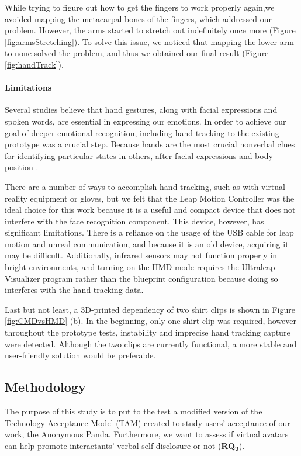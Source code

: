While trying to figure out how to get the fingers to work properly again,we avoided mapping the metacarpal bones of the fingers, which addressed our problem. However, the arms started to stretch out indefinitely once more (Figure \ref{fig:armsStretching}). To solve this issue, we noticed that mapping the lower arm to none solved the problem, and thus we obtained our final result (Figure \ref{fig:handTrack}).

\paragraph{Limitations}
Several studies \cite{ARJ20, WAX97, REI22} believe that hand gestures, along with facial expressions and spoken words, are essential in expressing our emotions. In order to achieve our goal of deeper emotional recognition, including hand tracking to the existing prototype was a crucial step. Because hands are the most crucial nonverbal clues for identifying particular states in others, after facial expressions and body position \cite{WAX97, REI22}.

There are a number of ways to accomplish hand tracking, such as with virtual reality equipment or gloves, but we felt that the Leap Motion Controller was the ideal choice for this work because it is a useful and compact device that does not interfere with the face recognition component. This device, however, has significant limitations. There is a reliance on the usage of the USB cable for leap motion and unreal communication, and because it is an old device, acquiring it may be difficult. Additionally, infrared sensors may not function properly in bright environments, and turning on the HMD mode requires the Ultraleap Visualizer program rather than the blueprint configuration because doing so interferes with the hand tracking data.

Last but not least, a 3D-printed dependency of two shirt clips is shown in Figure \ref{fig:CMDvsHMD} (b). In the beginning, only one shirt clip was required, however throughout the prototype tests, instability and imprecise hand tracking capture were detected. Although the two clips are currently functional, a more stable and user-friendly solution would be preferable.

\subsection{Methodology}
The purpose of this study is to put to the test a modified version of the Technology Acceptance Model (TAM) created to study users' acceptance of our work, the Anonymous Panda. Furthermore, we want to assess if virtual avatars can help promote interactants' verbal self-disclosure or not (\textbf{RQ\textsubscript{2}}).

